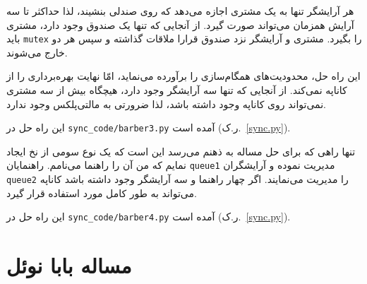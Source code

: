 \documentclass{book}
\newcommand{\clearemptydoublepage}{\newpage\cleardoublepage}
\begin{document}
    هر آرایشگر تنها به یک مشتری اجازه می‌دهد که روی صندلی بنشیند، لذا حداکثر تا سه آرایش همزمان می‌تواند صورت گیرد. از آنجایی که تنها یک صندوق وجود 
    دارد، مشتری باید  {\tt mutex} را بگیرد. مشتری و آرایشگر نزد صندوق قرارا ملاقات گذاشته و سپس هر دو خارج می‌شوند. 

    این راه حل،‌ محدودیت‌های همگام‌سازی را برآورده می‌نماید،‌ امّا نهایت بهره‌برداری را از کاناپه نمی‌کند. 
    از آنجایی که تنها سه آرایشگر وجود دارد، هیچگاه بیش از سه مشتری نمی‌تواند روی کاناپه وجود داشته باشد، لذا ضرورتی به مالتی‌پلکس وجود ندارد. 

    این راه حل در \verb"sync_code/barber3.py" آمده است (ر.ک.~\ref{sync.py}).


    تنها راهی که برای حل مساله به ذهنم می‌رسد این است که یک نوع سومی از نخ ایجاد نمایم که من آن را راهنما می‌نامم. 
    راهنمایان {\tt queue1} مدیریت نموده و آرایشگران {\tt queue2} را مدیریت می‌نمایند. اگر چهار راهنما و سه آرایشگر وجود داشته باشد 
    کاناپه می‌تواند به طور کامل مورد استفاده قرار گیرد. 

    این راه حل در \verb"sync_code/barber4.py" آمده است (ر.ک.~\ref{sync.py}).


\clearemptydoublepage
\section{مساله بابا نوئل}
\end{document}

